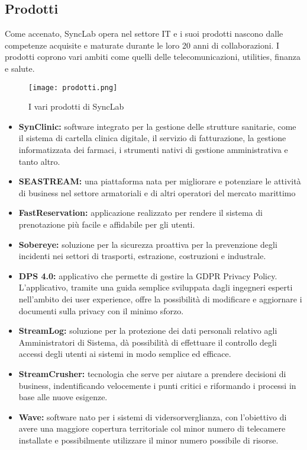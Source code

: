 \subsection{Prodotti}
Come accenato, SyncLab opera nel settore IT e i suoi prodotti nascono dalle competenze acquisite e maturate durante le loro 20 anni di collaborazioni. I prodotti coprono vari ambiti come quelli delle telecomunicazioni, utilities, finanza e salute.
\begin{figure}[H]
    \centering
    \texttt{[image: prodotti.png]}
    \caption{I vari prodotti di SyncLab}
\end{figure}
\begin{itemize}
    \item \textbf{SynClinic:} software integrato per la gestione delle strutture sanitarie, come il sistema di cartella clinica digitale, il servizio di fatturazione, la gestione informatizzata dei farmaci, i strumenti nativi di gestione amministrativa e tanto altro.
    \item \textbf{SEASTREAM:} una piattaforma nata per migliorare e potenziare le attività di business nel settore armatoriali e di altri operatori del mercato marittimo
    \item \textbf{FastReservation:} applicazione realizzato per rendere il sistema di prenotazione più facile e affidabile per gli utenti.
    \item \textbf{Sobereye:} soluzione per la sicurezza proattiva per la prevenzione degli incidenti nei settori di trasporti, estrazione, costruzioni e industrale.
    \item \textbf{DPS 4.0:} applicativo che permette di gestire la GDPR Privacy Policy. L'applicativo, tramite una guida semplice sviluppata dagli ingegneri esperti nell'ambito dei user experience, offre la possibilità di modificare e aggiornare i documenti sulla privacy con il minimo sforzo.
    \item \textbf{StreamLog:} soluzione per la protezione dei dati personali relativo agli Amministratori di Sistema, dà possibilità di effettuare il controllo degli accessi degli utenti ai sistemi in modo semplice ed efficace.
    \item \textbf{StreamCrusher:} tecnologia che serve per aiutare a prendere decisioni di business, indentificando velocemente i punti critici e riformando i processi in base alle nuove esigenze.
    \item \textbf{Wave:} software nato per i sistemi di vidersorverglianza, con l'obiettivo di avere una maggiore copertura territoriale col minor numero di telecamere installate e possibilmente utilizzare il minor numero possibile di risorse.
\end{itemize}

